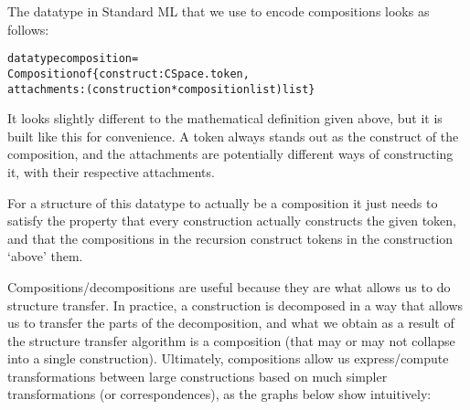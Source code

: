 \documentclass[a4paper]{article}
\theoremstyle{definition}
\begin{document}
		The datatype in Standard ML that we use to encode compositions looks as follows:
		\begin{alltt}
datatype composition = 
             Composition of \{construct : CSpace.token,
                             attachments : (construction * composition list) list\}
		\end{alltt}
	It looks slightly different to the mathematical definition given above, but it is built like this for convenience. A token always stands out as the construct of the composition, and the attachments are potentially different ways of constructing it, with their respective attachments.
	
	For a structure of this datatype to actually be a composition it just needs to satisfy the property that every construction actually constructs the given token, and that the compositions in the recursion construct tokens in the construction `above' them.
		
	Compositions/decompositions are useful because they are what allows us to do structure transfer. In practice, a construction is decomposed in a way that allows us to transfer the parts of the decomposition, and what we obtain as a result of the structure transfer algorithm is a composition (that may or may not collapse into a single construction). Ultimately, compositions allow us express/compute transformations between large constructions based on much simpler transformations (or correspondences), as the graphs below show intuitively:
	
\end{document}
